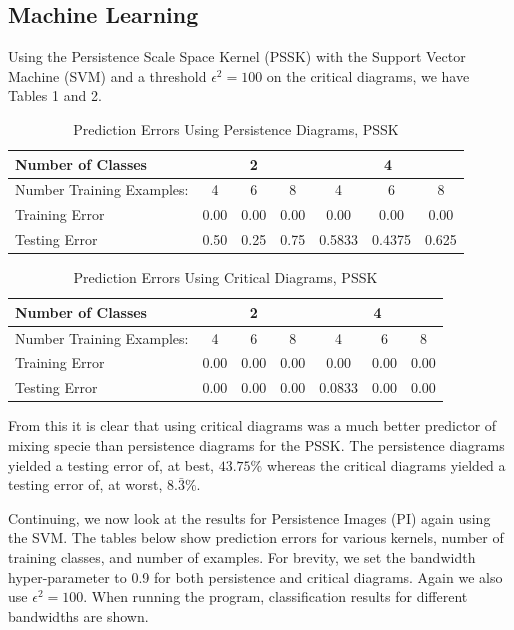 \documentclass[12pt, fullpage,letterpaper]{article}
\theoremstyle{definition}
\begin{document}
	\subsection*{\normalfont Machine Learning}
	Using the Persistence Scale Space Kernel (PSSK) with the Support Vector Machine (SVM) and a threshold $\epsilon^2 = 100$ on the critical diagrams, we have Tables 1 and 2.
	\begin{table}[h!]
		\centering
		\begin{tabular}{ |l|c|c|c|c|c|c| } 
			\hline
			Number of Classes & \multicolumn{3}{|c|}{2} & \multicolumn{3}{|c|}{4} \\
			\hline
			Number Training Examples:& 4 & 6 & 8 & 4 & 6 & 8 \\ 
			\hline
			Training Error  & 0.00 & 0.00 & 0.00 & 0.00 & 0.00 & 0.00 \\ 
			\hline
			Testing Error  & 0.50 & 0.25 & 0.75 & 0.5833 & 0.4375 & 0.625\\ 
			\hline
		\end{tabular}
		\caption{Prediction Errors Using Persistence Diagrams, PSSK}
	\end{table}
	\begin{table}[h!]
		\centering
		\begin{tabular}{ |l|c|c|c|c|c|c| } 
			\hline
			Number of Classes & \multicolumn{3}{|c|}{2} & \multicolumn{3}{|c|}{4} \\
			\hline
			Number Training Examples:& 4 & 6 & 8 & 4 & 6 & 8 \\ 
			\hline
			Training Error  & 0.00 & 0.00 & 0.00 & 0.00 & 0.00 & 0.00 \\ 
			\hline
			Testing Error  & 0.00 & 0.00 & 0.00 & 0.0833 & 0.00 & 0.00 \\ 
			\hline
		\end{tabular}
		\caption{Prediction Errors Using Critical Diagrams, PSSK}
	\end{table}
	From this it is clear that using critical diagrams was a much better predictor of mixing specie than persistence diagrams for the PSSK. The persistence diagrams yielded a testing error of, at best, $43.75\%$ whereas the critical diagrams yielded a testing error of, at worst, $8.\bar{3}\%$. 
	
	Continuing, we now look at the results for Persistence Images (PI) again using the SVM. The tables below show prediction errors for various kernels, number of training classes, and number of examples. For brevity, we set the bandwidth hyper-parameter to 0.9 for both persistence and critical diagrams. Again we also use $\epsilon^2 = 100$. When running the program, classification results for different bandwidths are shown.
	
\end{document}
